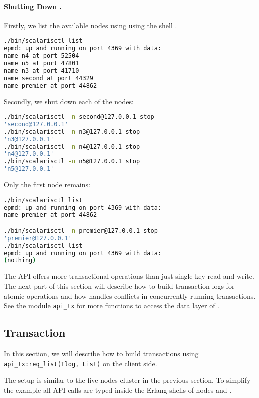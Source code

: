 \paragraph{Shutting Down \scalaris{}.}
Firstly, we list the available nodes using  using the
shell .

\begin{lstlisting}[language=sh]
./bin/scalarisctl list
epmd: up and running on port 4369 with data:
name n4 at port 52504
name n5 at port 47801
name n3 at port 41710
name second at port 44329
name premier at port 44862
\end{lstlisting}

Secondly, we shut down each of the nodes:
\begin{lstlisting}[language=sh]
./bin/scalarisctl -n second@127.0.0.1 stop
'second@127.0.0.1'
./bin/scalarisctl -n n3@127.0.0.1 stop
'n3@127.0.0.1'
./bin/scalarisctl -n n4@127.0.0.1 stop
'n4@127.0.0.1'
./bin/scalarisctl -n n5@127.0.0.1 stop
'n5@127.0.0.1'
\end{lstlisting}

Only the first node remains:

\begin{lstlisting}[language=sh]
./bin/scalarisctl list
epmd: up and running on port 4369 with data:
name premier at port 44862

./bin/scalarisctl -n premier@127.0.0.1 stop
'premier@127.0.0.1'
./bin/scalarisctl list
epmd: up and running on port 4369 with data:
(nothing)
\end{lstlisting}

The \scalaris{} API offers more transactional operations than just
single-key read and write.  The next part of this section will describe how
to build transaction logs for atomic operations and how \scalaris{}
handles conflicts in concurrently running transactions. See the module
\lstinline{api_tx} for more functions to access the data layer of
\scalaris{}.

\subsection{Transaction}
In this section, we will describe how to build transactions using
\lstinline{api_tx:req_list(Tlog, List)} on the client side.

The setup is similar to the five nodes cluster in the previous section.  To
simplify the example all API calls are typed inside the Erlang shells of
nodes  and .

